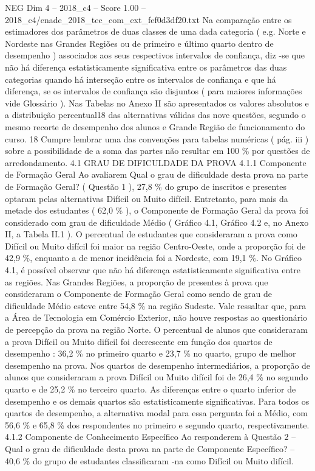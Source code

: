 \begin{textsample}{NEG Dim 4 – 2018\_c4 – Score 1.00 – 2018\_c4/enade\_2018\_tec\_com\_ext\_fef0d3df20.txt}
Na comparação entre os estimadores dos parâmetros de duas classes de uma dada categoria ( e.g.
Norte e Nordeste nas Grandes Regiões ou de primeiro e último quarto dentro de desempenho ) associados aos seus respectivos intervalos de confiança, diz -se que não há diferença estatisticamente significativa entre os parâmetros das duas categorias quando há interseção entre os intervalos de confiança e que há diferença, se os intervalos de confiança são disjuntos ( para maiores informações vide Glossário ).
Nas Tabelas no Anexo II são apresentados os valores absolutos e a distribuição percentual18 das alternativas válidas das nove questões, segundo o mesmo recorte de desempenho dos alunos e Grande Região de funcionamento do curso. 18 Cumpre lembrar uma das convenções para tabelas numéricas ( pág. iii ) sobre a possibilidade de a soma das partes não resultar em 100 \% por questões de arredondamento. 4.1 GRAU DE DIFICULDADE DA PROVA 4.1.1 Componente de Formação Geral Ao avaliarem Qual o grau de dificuldade desta prova na parte de Formação Geral? ( Questão 1 ), 27,8 \% do grupo de inscritos e presentes optaram pelas alternativas Difícil ou Muito difícil.
Entretanto, para mais da metade dos estudantes ( 62,0 \% ), o Componente de Formação Geral da prova foi considerado com grau de dificuldade Médio ( Gráfico 4.1, Gráfico 4.2 e, no Anexo II, a Tabela II.1 ).
O percentual de estudantes que consideraram a prova como Difícil ou Muito difícil foi maior na região Centro-Oeste, onde a proporção foi de 42,9 \%, enquanto a de menor incidência foi a Nordeste, com 19,1 \%.
No Gráfico 4.1, é possível observar que não há diferença estatisticamente significativa entre as regiões.
Nas Grandes Regiões, a proporção de presentes à prova que consideraram o Componente de Formação Geral como sendo de grau de dificuldade Médio esteve entre 54,8 \% na região Sudeste.
Vale ressaltar que, para a Área de Tecnologia em Comércio Exterior, não houve respostas ao questionário de percepção da prova na região Norte.
O percentual de alunos que consideraram a prova Difícil ou Muito difícil foi decrescente em função dos quartos de desempenho : 36,2 \% no primeiro quarto e 23,7 \% no quarto, grupo de melhor desempenho na prova.
Nos quartos de desempenho intermediários, a proporção de alunos que consideraram a prova Difícil ou Muito difícil foi de 26,4 \% no segundo quarto e de 25,2 \% no terceiro quarto.
As diferenças entre o quarto inferior de desempenho e os demais quartos são estatisticamente significativas.
Para todos os quartos de desempenho, a alternativa modal para essa pergunta foi a Médio, com 56,6 \% e 65,8 \% dos respondentes no primeiro e segundo quarto, respectivamente. 4.1.2 Componente de Conhecimento Específico Ao responderem à Questão 2 – Qual o grau de dificuldade desta prova na parte de Componente Específico? – 40,6 \% do grupo de estudantes classificaram -na como Difícil ou Muito difícil.

\end{textsample}
